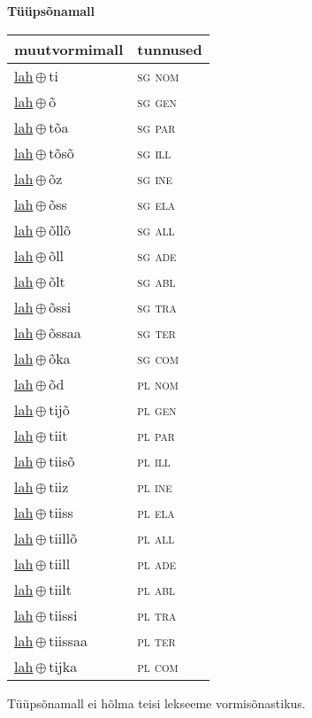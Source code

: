 

\vspace{3.5em}
\noindent \begin{minipage}{\textwidth}
\noindent \textbf{Tüüpsõnamall \,}\\

\begin{sideways}
\begin{tabular}{l l}
muutvormimall & tunnused \\
\hline
\underline{lah}\,$\oplus$\,ti & \textsc{ sg nom } \\
\underline{lah}\,$\oplus$\,õ & \textsc{ sg gen } \\
\underline{lah}\,$\oplus$\,tõa & \textsc{ sg par } \\
\underline{lah}\,$\oplus$\,tõsõ & \textsc{ sg ill } \\
\underline{lah}\,$\oplus$\,õz & \textsc{ sg ine } \\
\underline{lah}\,$\oplus$\,õss & \textsc{ sg ela } \\
\underline{lah}\,$\oplus$\,õllõ & \textsc{ sg all } \\
\underline{lah}\,$\oplus$\,õll & \textsc{ sg ade } \\
\underline{lah}\,$\oplus$\,õlt & \textsc{ sg abl } \\
\underline{lah}\,$\oplus$\,õssi & \textsc{ sg tra } \\
\underline{lah}\,$\oplus$\,õssaa & \textsc{ sg ter } \\
\underline{lah}\,$\oplus$\,õka & \textsc{ sg com } \\
\underline{lah}\,$\oplus$\,õd & \textsc{ pl nom } \\
\underline{lah}\,$\oplus$\,tijõ & \textsc{ pl gen } \\
\underline{lah}\,$\oplus$\,tiit & \textsc{ pl par } \\
\underline{lah}\,$\oplus$\,tiisõ & \textsc{ pl ill } \\
\underline{lah}\,$\oplus$\,tiiz & \textsc{ pl ine } \\
\underline{lah}\,$\oplus$\,tiiss & \textsc{ pl ela } \\
\underline{lah}\,$\oplus$\,tiillõ & \textsc{ pl all } \\
\underline{lah}\,$\oplus$\,tiill & \textsc{ pl ade } \\
\underline{lah}\,$\oplus$\,tiilt & \textsc{ pl abl } \\
\underline{lah}\,$\oplus$\,tiissi & \textsc{ pl tra } \\
\underline{lah}\,$\oplus$\,tiissaa & \textsc{ pl ter } \\
\underline{lah}\,$\oplus$\,tijka & \textsc{ pl com } \\
\end{tabular}
\end{sideways}
\label{tab:tüüpsõnamall-lahti}

\end{minipage}

 
\vspace{1em}
\noindent Tüüpsõnamall  ei hõlma teisi lekseeme vormi\-sõnastikus.
